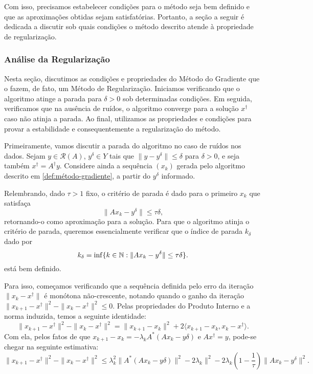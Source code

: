 Com isso, precisamos estabelecer condições para o método seja bem definido e que as aproximações obtidas sejam satisfatórias. Portanto, a seção a seguir é dedicada a discutir sob quais condições o método descrito atende à propriedade de regularização.

\subsubsection{Análise da Regularização}

Nesta seção, discutimos as condições e propriedades do Método do Gradiente que o fazem, de fato, um Método de Regularização. Iniciamos verificando que o algoritmo atinge a parada para $\delta>0$ sob determinadas condições. Em seguida, verificamos que na ausência de ruídos, o algoritmo converge para a solução $x^\dag$ caso não atinja a parada. Ao final, utilizamos as propriedades e condições para provar a estabilidade e consequentemente a regularização do método.

Primeiramente, vamos discutir a parada do algoritmo no caso de ruídos nos dados. Sejam $y\in \mathcal{R}(A)$, $y^\delta\in Y$ tais que $\| y-y^\delta\|\leq\delta$ para $\delta>0$, e seja também $x^\dag = A^\dag y$. Considere ainda a sequência $(x_k)$ gerada pelo algoritmo descrito em \ref{def:método-gradiente}, a partir do $y^\delta$ informado.

Relembrando, dado $\tau>1$ fixo, o critério de parada é dado para o primeiro $x_k$ que satisfaça
\begin{equation}\label{eq:parada-discrepancia-gradiente}
 \| Ax_k - y^\delta\| \leq \tau \delta,
\end{equation}
retornando-o como aproximação para a solução. Para que o algoritmo atinja o critério de parada, queremos essencialmente verificar que o índice de parada $k_\delta$ dado por
\begin{equation}\label{eq:k-delta-gradiente}
    k_\delta = \inf \{k \in \mathbb N : \|Ax_k -y^\delta \|\leq \tau \delta\}.
\end{equation}
está bem definido. 

Para isso, começamos verificando que a sequência definida pelo erro da iteração $\| x_k - x^\dag \|$ é monótona não-crescente, notando quando o ganho da iteração $ \| x_{k+1} - x^\dag\|^2 - \|x_k - x^\dag \|^2\leq 0$. Pelas propriedades do Produto Interno e a norma induzida, temos a seguinte identidade:
\begin{equation}\label{eq:identidade-gradiente}
    \| x_{k+1} - x^\dag\|^2 - \|x_k - x^\dag \|^2 = \| x_{k+1}-x_k\|^2 + 2\langle x_{k+1}-x_k, x_k - x^\dag \rangle.
\end{equation}
Com ela, pelos fatos de que $x_{k+1}-x_k = -\lambda_k A^*(Ax_k - y\delta)$ e $Ax^\dag=y$, pode-se chegar na seguinte estimativa:
\[
 \| x_{k+1} - x^\dag\|^2 - \|x_k - x^\dag \|^2 \leq \lambda_k^2 \| A^*(Ax_k - y\delta)\|^2 - 2 \lambda_k \|^2 - 2 \lambda_k (1- \frac 1 \tau)\| Ax_k - y^\delta\|^2.
\]

